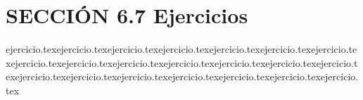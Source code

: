 
\section*{SECCIÓN 6.7 \quad Ejercicios}

\begin{enumerate}
	{ejercicio.tex}{ejercicio.tex}{ejercicio.tex}{ejercicio.tex}{ejercicio.tex}{ejercicio.tex}{ejercicio.tex}{ejercicio.tex}{ejercicio.tex}{ejercicio.tex}{ejercicio.tex}{ejercicio.tex}{ejercicio.tex}{ejercicio.tex}{ejercicio.tex}{ejercicio.tex}{ejercicio.tex}{ejercicio.tex}{ejercicio.tex}{ejercicio.tex}{ejercicio.tex}\end{enumerate}